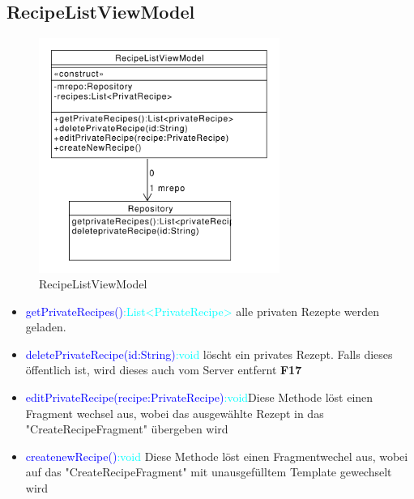\subsection{RecipeListViewModel}
\begin{figure}[H]
	\centering
	\includegraphics[width=0.7\textwidth]{pics/viewModel/Recipe_List_ViewModel.pdf}%
	\caption{RecipeListViewModel}%
	\label{viewModel}%
\end{figure}
\begin{itemize}
	\item \textcolor{blue}{getPrivateRecipes()}\textcolor{cyan}{:List<PrivateRecipe>}
	alle privaten Rezepte werden geladen.
	\item  \textcolor{blue}{deletePrivateRecipe(id:String)}\textcolor{cyan}{:void}
	löscht ein privates Rezept. Falls dieses öffentlich ist, wird dieses auch vom Server entfernt \textbf{F17}
	\item \textcolor{blue}{editPrivateRecipe(recipe:PrivateRecipe)}\textcolor{cyan}{:void}Diese Methode löst einen Fragment wechsel aus, wobei das ausgewählte Rezept in das "CreateRecipeFragment" übergeben wird
	\item \textcolor{blue}{createnewRecipe()}\textcolor{cyan}{:void}
	Diese Methode löst einen Fragmentwechel aus, wobei auf das "CreateRecipeFragment" mit unausgefülltem Template gewechselt wird
\end{itemize}


